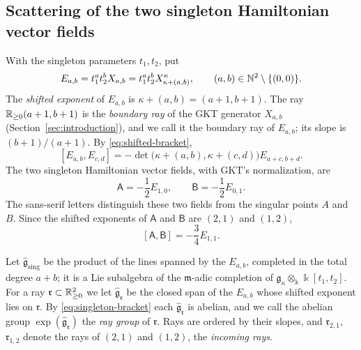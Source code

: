\subsection{Scattering of the two singleton Hamiltonian vector fields}
\label{subsec:singleton-scattering}

With the singleton parameters $t_1,t_2$, put
\begin{equation}\label{eq:singleton-generators}
 E_{a,b}=t_1^at_2^bX_{a,b}=t_1^at_2^bX_{\kappa+(a,b)}^\kappa,
 \qquad (a,b)\in\mathbb N^2\setminus\{(0,0)\}.
\end{equation}
The \emph{shifted exponent} of $E_{a,b}$ is $\kappa+(a,b)=(a+1,b+1)$.  The
ray $\mathbb R_{\geq0}(a+1,b+1)$ is the \emph{boundary ray} of the GKT generator
$X_{a,b}$ (Section~\ref{sec:introduction}), and we call it the boundary ray
of $E_{a,b}$; its slope is $(b+1)/(a+1)$.  By \eqref{eq:shifted-bracket},
\begin{equation}\label{eq:singleton-bracket}
 [E_{a,b},E_{c,d}]
 =-\det\bigl(\kappa+(a,b),\kappa+(c,d)\bigr)E_{a+c,b+d}.
\end{equation}
The two singleton Hamiltonian vector fields, with GKT's
normalization, are
\begin{equation}\label{eq:incoming-singletons}
 \mathsf A=-\frac12E_{1,0},
 \qquad \mathsf B=-\frac12E_{0,1}.
\end{equation}
The sans-serif letters distinguish these two fields from the singular
points $A$ and $B$.
Since the shifted exponents of $\mathsf A$ and $\mathsf B$ are $(2,1)$ and
$(1,2)$,
\begin{equation}\label{eq:first-bracket}
 [\mathsf A,\mathsf B]= -\frac34E_{1,1}.
\end{equation}

Let $\widehat{\mathfrak g}_{\mathrm{sing}}$ be the product of the lines
spanned by the $E_{a,b}$, completed in the total degree $a+b$; it is a Lie
subalgebra of the $\mathfrak m$-adic completion of $\mathfrak g_\kappa\otimes_\Bbbk
\Bbbk[t_1,t_2]$.  For a ray
$\mathfrak r\subset\mathbb R_{\geq0}^2$ we let $\widehat{\mathfrak g}_{\mathfrak r}$
be the closed span of the $E_{a,b}$ whose shifted exponent lies on
$\mathfrak r$.  By \eqref{eq:singleton-bracket} each
$\widehat{\mathfrak g}_{\mathfrak r}$ is abelian, and we call the abelian
group $\exp(\widehat{\mathfrak g}_{\mathfrak r})$ the \emph{ray group} of
$\mathfrak r$.  Rays are ordered by their slopes, and $\mathfrak r_{2,1}$,
$\mathfrak r_{1,2}$ denote the rays of $(2,1)$ and $(1,2)$, the
\emph{incoming rays}.

